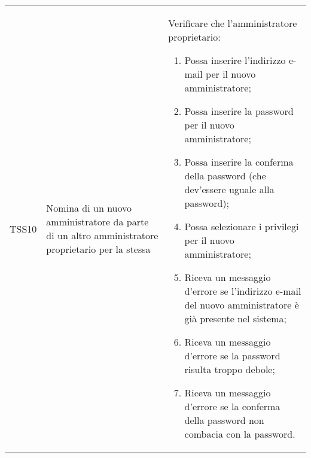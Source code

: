 {\begin{longtable}{ c  C{3cm}  C{11cm} }
TSS10 & Nomina di un nuovo amministratore da parte di un altro amministratore proprietario per la stessa  & 
Verificare che l'amministratore proprietario:
\begin{enumerate}
    \item Possa inserire l'indirizzo e-mail per il nuovo amministratore;
    \item Possa inserire la password per il nuovo amministratore;
    \item Possa inserire la conferma della password (che dev'essere uguale alla password);
    \item Possa selezionare i privilegi per il nuovo amministratore;
    \item Riceva un messaggio d'errore se l'indirizzo e-mail del nuovo amministratore è già presente nel sistema;
    \item Riceva un messaggio d'errore se la password risulta troppo debole;
    \item Riceva un messaggio d'errore se la conferma della password non combacia con la password.
\end{enumerate} \\
\end{longtable}
}